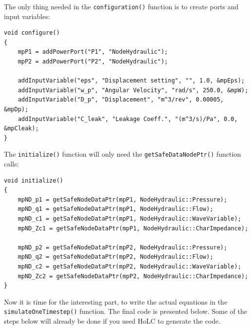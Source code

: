 \documentclass[a4paper,pdftex]{article}
\begin{document}
\noindent The only thing needed in the \texttt{configuration()} function is to create ports and input variables:

\begin{minipage}{\linewidth}
\begin{lstlisting}[basicstyle=\footnotesize\ttfamily]
void configure()
{
    mpP1 = addPowerPort("P1", "NodeHydraulic");
    mpP2 = addPowerPort("P2", "NodeHydraulic");

	addInputVariable("eps", "Displacement setting", "", 1.0, &mpEps);
    addInputVariable("w_p", "Angular Velocity", "rad/s", 250.0, &mpW);
    addInputVariable("D_p", "Displacement", "m^3/rev", 0.00005, &mpDp);
    addInputVariable("C_leak", "Leakage Coeff.", "(m^3/s)/Pa", 0.0, &mpCleak);
}
\end{lstlisting}
\end{minipage}

\noindent The \texttt{initialize()} function will only need the \texttt{getSafeDataNodePtr()} function calls:

\begin{minipage}{\linewidth}
\begin{lstlisting}[basicstyle=\footnotesize\ttfamily]
void initialize()
{
    mpND_p1 = getSafeNodeDataPtr(mpP1, NodeHydraulic::Pressure);
    mpND_q1 = getSafeNodeDataPtr(mpP1, NodeHydraulic::Flow);
    mpND_c1 = getSafeNodeDataPtr(mpP1, NodeHydraulic::WaveVariable);
    mpND_Zc1 = getSafeNodeDataPtr(mpP1, NodeHydraulic::CharImpedance);

    mpND_p2 = getSafeNodeDataPtr(mpP2, NodeHydraulic::Pressure);
    mpND_q2 = getSafeNodeDataPtr(mpP2, NodeHydraulic::Flow);
    mpND_c2 = getSafeNodeDataPtr(mpP2, NodeHydraulic::WaveVariable);
    mpND_Zc2 = getSafeNodeDataPtr(mpP2, NodeHydraulic::CharImpedance);
}
\end{lstlisting}
\end{minipage}

\noindent Now it is time for the interesting part, to write the actual equations in the \texttt{simulateOneTimestep()} function. The final code is presented below. Some of the steps below will already be done if you used HoLC to generate the code.
\end{document}

